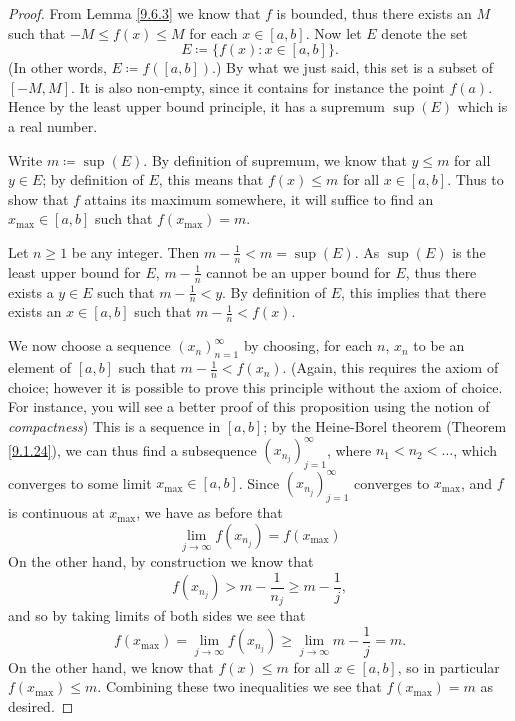 \begin{proof}
    From Lemma \ref{9.6.3} we know that \(f\) is bounded, thus there exists an \(M\) such that \(-M \leq f(x) \leq M\) for each \(x \in [a, b]\).
    Now let \(E\) denote the
    set
    \[
        E \coloneqq \{f(x) : x \in [a, b]\}.
    \]
    (In other words, \(E \coloneqq f([a, b])\).)
    By what we just said, this set is a subset of \([-M, M]\).
    It is also non-empty, since it contains for instance the point \(f(a)\).
    Hence by the least upper bound principle, it has a supremum \(\sup(E)\) which is a real number.

    Write \(m \coloneqq \sup(E)\).
    By definition of supremum, we know that \(y \leq m\) for all \(y \in E\);
    by definition of \(E\), this means that \(f(x) \leq m\) for all \(x \in [a, b]\).
    Thus to show that \(f\) attains its maximum somewhere, it will suffice to find an \(x_{\max} \in [a, b]\) such that \(f(x_{\max}) = m\).

    Let \(n \geq 1\) be any integer.
    Then \(m - \frac{1}{n} < m = \sup(E)\).
    As \(\sup(E)\) is the least upper bound for \(E\), \(m - \frac{1}{n}\) cannot be an upper bound for \(E\), thus there exists a \(y \in E\) such that \(m - \frac{1}{n} < y\).
    By definition of \(E\), this implies that there exists an \(x \in [a, b]\) such that \(m - \frac{1}{n} < f(x)\).

    We now choose a sequence \((x_n)_{n = 1}^\infty\) by choosing, for each \(n\), \(x_n\) to be an element of \([a, b]\) such that \(m - \frac{1}{n} < f(x_n)\).
    (Again, this requires the axiom of choice;
    however it is possible to prove this principle without the axiom of choice.
    For instance, you will see a better proof of this proposition using the notion of \emph{compactness})
    This is a sequence in \([a, b]\);
    by the Heine-Borel theorem (Theorem \ref{9.1.24}), we can thus find a subsequence \((x_{n_j})_{j = 1}^\infty\), where \(n_1 < n_2 < \dots\), which converges to some limit \(x_{\max} \in [a, b]\).
    Since \((x_{n_j})_{j = 1}^\infty\) converges to \(x_{\max}\), and \(f\) is continuous at \(x_{\max}\), we have as before that
    \[
        \lim_{j \to \infty} f(x_{n_j}) = f(x_{\max})
    \]
    On the other hand, by construction we know that
    \[
        f(x_{n_j}) > m - \frac{1}{n_j} \geq m - \frac{1}{j},
    \]
    and so by taking limits of both sides we see that
    \[
        f(x_{\max}) = \lim_{j \to \infty} f(x_{n_j}) \geq \lim_{j \to \infty} m - \frac{1}{j} = m.
    \]
    On the other hand, we know that \(f(x) \leq m\) for all \(x \in [a, b]\), so in particular \(f(x_{\max}) \leq m\).
    Combining these two inequalities we see that \(f(x_{\max}) = m\) as desired.


\end{proof}
